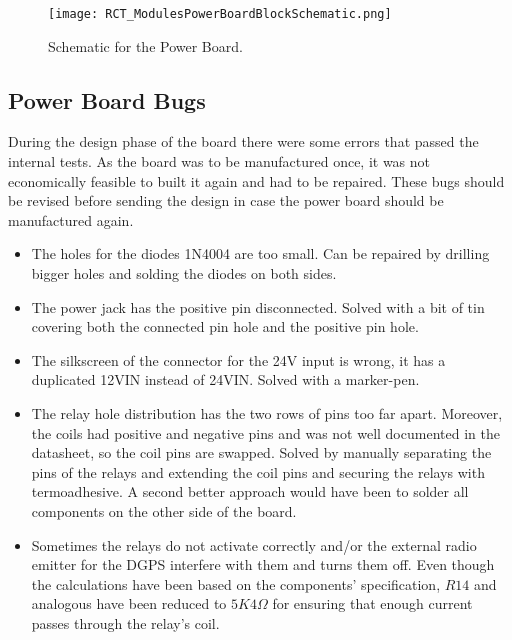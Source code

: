 \begin{figure}[htbp]
\begin{center}
 {\texttt{[image: RCT\_ModulesPowerBoardBlockSchematic.png]}}
\end{center}
\caption{Schematic for the Power Board.}
\label{fig:ModulesPowerBoardBlockSchematic}
\end{figure}



\subsection{Power Board Bugs}
During the design phase of the board there were some errors that passed the
internal tests. As the board was to be manufactured once, it was not
economically feasible to built it again and had to be repaired. These bugs
should be revised before sending the design in case the power board should
be manufactured again.
\begin{itemize}
  \item The holes for the diodes 1N4004 are too small. Can be repaired by
    drilling bigger holes and solding the diodes on both sides.
  \item The power jack has the positive pin disconnected. Solved with a bit of
    tin covering both the connected pin hole and the positive pin hole.
  \item The silkscreen of the connector for the 24V input is wrong, it has a
    duplicated 12VIN instead of 24VIN. Solved with a marker-pen.
  \item The relay hole distribution has the two rows of pins too far apart.
    Moreover, the coils had positive and negative pins and was not well
    documented in the datasheet, so the coil pins are swapped. Solved by
    manually separating the pins of the relays and extending the coil pins and
    securing the relays with termoadhesive. A second better approach would have been to
    solder all components on the other side of the board.
  \item Sometimes the relays do not activate correctly and/or the external radio
    emitter for the DGPS interfere with them and turns them off. Even though the
    calculations have been based on the components' specification, $R14$ and
    analogous have been reduced to $5K4\Omega$ for ensuring that enough current
    passes through the relay's coil.
\end{itemize}


